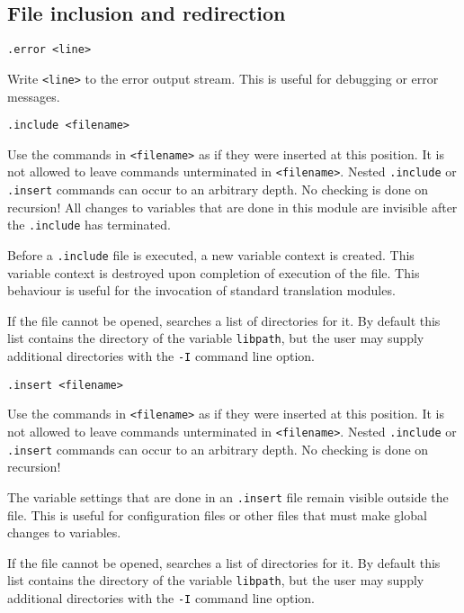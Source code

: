 \subsection{File inclusion and redirection}
\begin{verbatim}
.error <line>
\end{verbatim}
\begin{desc}
Write {\tt <line>} to the error output stream.
This is useful for debugging or error messages.
\end{desc}
\begin{verbatim}
.include <filename>
\end{verbatim}
\begin{desc}
Use the {\Tm} commands in {\tt <filename>} as if they were inserted at
this position.
It is not allowed to leave commands unterminated in {\tt <filename>}.
Nested {\tt .include} or {\tt .insert} commands can occur to an arbitrary depth.
No checking is done on recursion!
All changes to variables that are done in this module are invisible after
the {\tt .include} has terminated.
\par
Before a \verb'.include' file is executed, a new variable context is
created. This variable context is destroyed upon completion of execution
of the file. This behaviour is useful for the invocation of standard
translation modules.
\par
If the file cannot be opened, {\Tm} searches a list of directories for it.
By default this list contains the directory of the variable
\verb+libpath+, but the user may supply additional directories with the
\verb+-I+ command line option.
\end{desc}
\begin{verbatim}
.insert <filename>
\end{verbatim}
\begin{desc}
Use the {\Tm} commands in {\tt <filename>} as if they were inserted at
this position.
It is not allowed to leave commands unterminated in {\tt <filename>}.
Nested {\tt .include} or {\tt .insert}
commands can occur to an arbitrary depth.
No checking is done on recursion!
\par
The variable settings that are done in an {\tt .insert}
file remain visible outside the file.
This is useful for configuration files or other files that
must make global changes to variables.
\par
If the file cannot be opened, {\Tm} searches a list of directories for it.
By default this list contains the directory of the variable
\verb+libpath+, but the user may supply additional directories with the
\verb+-I+ command line option.
\end{desc}
